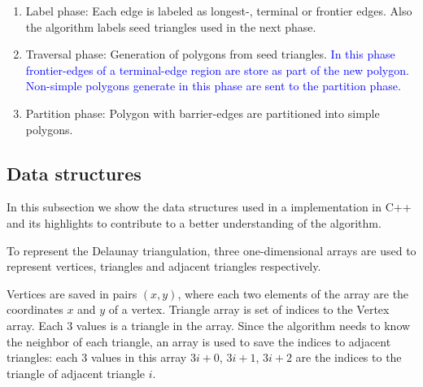 \begin{enumerate}[label=\roman*)]
    \item Label phase: Each edge is labeled as  longest-, terminal or frontier edges. Also the algorithm labels seed triangles used in the next phase.
    \item Traversal phase: Generation of polygons from seed triangles. \textcolor{blue}{In this phase frontier-edges of a terminal-edge region are store as part of the new polygon. Non-simple polygons generate in this phase are sent to the partition phase.}
    \item Partition phase: Polygon with barrier-edges are partitioned into simple polygons.
\end{enumerate}


\subsection{Data structures}
\label{sec:datastructrue}
In this subsection we show the data structures used in a implementation in C++ and its highlights to  contribute to a better understanding of the algorithm.  %



To represent the Delaunay triangulation, three one-dimensional arrays are used to represent  vertices, triangles and adjacent triangles respectively.

Vertices are saved in pairs $(x,y)$, where each two elements of the array are the coordinates $x$ and $y$ of a vertex. Triangle array is set of indices to the Vertex array. Each 3 values is a triangle in the array. Since the algorithm needs to know the neighbor of each triangle, an array is used to save the indices to adjacent triangles: each 3 values in this array $3i + 0$, $3i + 1$, $3i + 2$ are the indices to the triangle of adjacent triangle $i$. 

